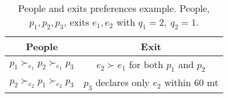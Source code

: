 \begin{table}[!htb]
    \centering
    \begin{tabular}{c|c}
        \hline People                                             & Exit                                                       \\
        \hline\( p_{1} \succ_{e_{1}} p_{2} \succ_{e_{1}} p_{3} \) & \( e_{2} \succ e_{1} \) for both \( p_{1} \) and \( p_{2} \) \\
        \( p_{2} \succ_{e_{2}} p_{1} \succ_{e_{2}} p_{3} \)       & \( p_{3} \) declares only \( e_{2} \) within 60 mt         \\
        \hline
    \end{tabular}
    \caption{People and exits preferences example. People, \(p_1, p_2, p_3\), exits \(e_1, e_2\) with \( q_1 = 2, \ q_2 = 1\).}
    \label{tab:people-exit}
\end{table}
